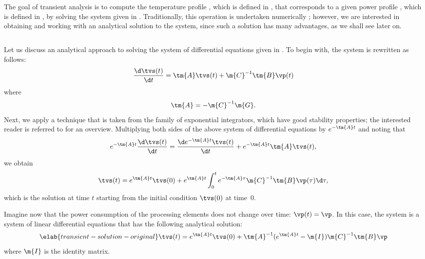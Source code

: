 The goal of transient analysis is to compute the temperature profile \mq, which
is defined in , that corresponds to a given power
profile \mp, which is defined in , by solving the system
given in . Traditionally, this operation is
undertaken numerically \cite{skadron2003}; however, we are interested in
obtaining and working with an analytical solution to the system, since such a
solution has many advantages, as we shall see later on.

\subsection{\pasttitle}

Let us discuss an analytical approach to solving the system of differential
equations given in . To begin with, the
system is rewritten as follows:
\[
  \frac{\d \tvs(t)}{\d t} = \tm{A} \tvs(t) + \m{C}^{-1} \tm{B} \vp(t)
\]
where
\[
  \tm{A} = -\m{C}^{-1} \m{G}.
\]
Next, we apply a technique that is taken from the family of exponential
integrators, which have good stability properties; the interested reader is
referred to \cite{hochbruck2010} for an overview. Multiplying both sides of the
above system of differential equations by $e^{-\tm{A} t}$ and noting that
\[
  e^{-\tm{A} t} \frac{\d \tvs(t)}{\d t} = \frac{\d e^{-\tm{A} t} \tvs(t)}{\d t} + e^{-\tm{A} t} \tm{A} \tvs(t),
\]
we obtain
\[
  \tvs(t) = e^{\tm{A} t} \tvs(0) + e^{\tm{A} t} \int_0^t e^{-\tm{A} \tau} \m{C}^{-1} \tm{B} \vp(\tau) \d \tau,
\]
which is the solution at time $t$ starting from the initial condition $\tvs(0)$
at time~0.

Imagine now that the power consumption of the processing elements does not
change over time: $\vp(t) = \vp$. In this case, the system is a system of linear
differential equations that has the following analytical solution:
\begin{equation} \elab{transient-solution-original}
  \tvs(t) = e^{\tm{A} t} \tvs(0) + \tm{A}^{-1} (e^{\tm{A} t} - \m{I}) \m{C}^{-1} \tm{B} \vp
\end{equation}
where $\m{I}$ is the identity matrix.

